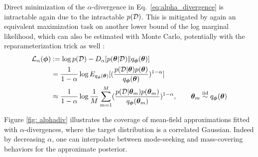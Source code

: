 Direct minimization of the $\alpha$-divergence in Eq.~\eqref{eq:alpha_divergence} is intractable again due to the intractable $p(\mathcal{D})$. This is mitigated by again an equivalent maximization task on another lower bound of the log marginal likelihood, which can also be estimated with Monte Carlo, potentially with the reparameterization trick as well \citep{li2016renyi}:
%
\begin{equation}
     \begin{split}
        \mathcal{L}_{\alpha}(\bm{\phi}) &:=\log p(\mathcal{D}) - D_{\alpha}[ p(\bm{\theta}|\mathcal{D}) \| q_{\bm{\phi}}(\bm{\theta}) ]\\
        &= \frac{1}{1-\alpha} \log E_{q_{\bm{\phi}}(\bm{\theta})}[(\frac{p(\mathcal{D}|\bm{\theta})p(\bm{\theta})}{q_{\bm{\phi}}(\bm{\theta})})^{1-\alpha}]\\
        &\approx \frac{1}{1-\alpha} \log \frac{1}{M} \sum_{m=1}^M  (\frac{p(\mathcal{D}|\bm{\theta}_m)p(\bm{\theta}_m)}{q_{\bm{\phi}}(\bm{\theta}_m)})^{1-\alpha}, \qquad \bm{\theta}_m \stackrel{\text{iid}}{\sim} q_{\bm{\phi}}(\bm{\theta})
    \end{split}
\end{equation}
%
\begin{comment}
\wc{In practice, we first identify minimizing $D_{\alpha}[ p(\mparam|\data) \| q_{\vparam}(\mparam)]$ is equivalent to minimizing $-E_{q_{\vparam}(\mparam)} [\frac{p(\mparam, \data)}{q_{\vparam}(\mparam)}]^{\alpha}$: 
\begin{equation}
     \begin{split}
      D_{\alpha}[ p(\mparam|\data) \| q_{\vparam}(\mparam) ]&\propto 1-\int p(\mparam|\data)^{\alpha} q_{\vparam}(\mparam)^{1-\alpha} d\mparam\\
        & = -E_{q_{\vparam}(\mparam)} [\frac{p(\mparam|\data)}{q_{\vparam}(\mparam)}]^{\alpha} + C_1\\
        &= -(\frac{1}{p(\data)})^{\alpha}E_{q_{\vparam}(\mparam)} [\frac{p(\mparam, \data)}{q_{\vparam}(\mparam)}]^{\alpha} + C_1\\
        &= -C_2 E_{q_{\vparam}(\mparam)} [\frac{p(\mparam, \data)}{q_{\vparam}(\mparam)}]^{\alpha} + C_1.  \qquad (C_1, C_2 \text{ are constants)}
    \end{split}
\end{equation}
Then minimize the logarithm of $-E_{q_{\vparam}(\mparam)} [\frac{p(\mparam, \data)}{q_{\vparam}(\mparam)}]^{\alpha}$. Again, we take advantage of Monte-Carlo estimation to obtain the final objective:
\begin{equation}
     \mathcal{L}_{\alpha}(\vparam)= -\log \frac{1}{M} \sum_{m=1}^M  (\frac{p(\data|\mparam_m)p(\mparam_m)}{q_{\vparam}(\mparam_m)})^{\alpha}, \qquad \mparam_m \sim q_{\vparam}(\mparam)
\end{equation}
}
\end{comment}
Figure \ref{fig: alphadiv} illustrates the coverage of mean-field approximations fitted with $\alpha$-divergences, where the target distribution is a correlated Gaussian. Indeed by decreasing $\alpha$, one can interpolate between mode-seeking and mass-covering behaviors for the approximate posterior. 

